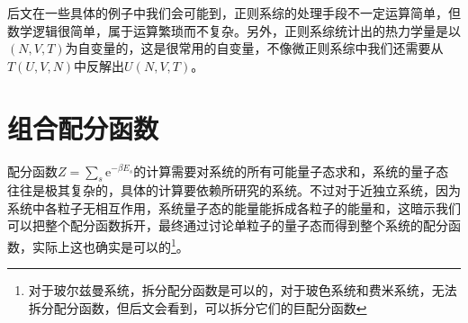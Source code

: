 \documentclass[../../main.tex]{subfiles}
\begin{document}
后文在一些具体的例子中我们会可能到，正则系综的处理手段不一定运算简单，但数学逻辑很简单，属于运算繁琐而不复杂。另外，正则系综统计出的热力学量是以\((N,V,T)\)为自变量的，这是很常用的自变量，不像微正则系综中我们还需要从\(T(U,V,N)\)中反解出\(U(N,V,T)\)。

\section{组合配分函数}\label{sec:组合配分函数}

配分函数\(Z=\sum_s\mathrm{e}^{-\beta E_s}\)的计算需要对系统的所有可能量子态求和，系统的量子态往往是极其复杂的，具体的计算要依赖所研究的系统。不过对于近独立系统，因为系统中各粒子无相互作用，系统量子态的能量能拆成各粒子的能量和，这暗示我们可以把整个配分函数拆开，最终通过讨论单粒子的量子态而得到整个系统的配分函数，实际上这也确实是可以的\footnote{对于玻尔兹曼系统，拆分配分函数是可以的，对于玻色系统和费米系统，无法拆分配分函数，但后文会看到，可以拆分它们的巨配分函数}。
\end{document}
